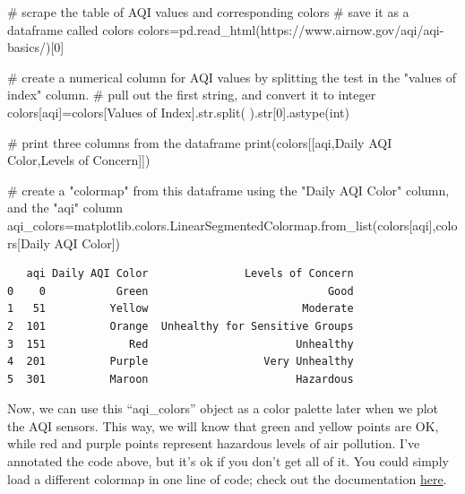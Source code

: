 \documentclass[
  letterpaper,
  DIV=11,
  numbers=noendperiod]{scrreprt}
\newenvironment{Shaded}{\begin{snugshade}}{\end{snugshade}}
\newcommand{\BuiltInTok}[1]{\textcolor[rgb]{0.00,0.23,0.31}{#1}}
\newcommand{\CommentTok}[1]{\textcolor[rgb]{0.37,0.37,0.37}{#1}}
\newcommand{\DecValTok}[1]{\textcolor[rgb]{0.68,0.00,0.00}{#1}}
\newcommand{\NormalTok}[1]{\textcolor[rgb]{0.00,0.23,0.31}{#1}}
\newcommand{\OperatorTok}[1]{\textcolor[rgb]{0.37,0.37,0.37}{#1}}
\newcommand{\StringTok}[1]{\textcolor[rgb]{0.13,0.47,0.30}{#1}}
\begin{document}
\begin{Shaded}
\begin{Highlighting}[]
\CommentTok{\# scrape the table of AQI values and corresponding colors }
\CommentTok{\# save it as a dataframe called colors}
\NormalTok{colors}\OperatorTok{=}\NormalTok{pd.read\_html(}\StringTok{\textquotesingle{}https://www.airnow.gov/aqi/aqi{-}basics/\textquotesingle{}}\NormalTok{)[}\DecValTok{0}\NormalTok{]}

\CommentTok{\# create a numerical column for AQI values by splitting the test in the "values of index" column. }
\CommentTok{\# pull out the first string, and convert it to integer}
\NormalTok{colors[}\StringTok{\textquotesingle{}aqi\textquotesingle{}}\NormalTok{]}\OperatorTok{=}\NormalTok{colors[}\StringTok{\textquotesingle{}Values of Index\textquotesingle{}}\NormalTok{].}\BuiltInTok{str}\NormalTok{.split(}\StringTok{\textquotesingle{} \textquotesingle{}}\NormalTok{).}\BuiltInTok{str}\NormalTok{[}\DecValTok{0}\NormalTok{].astype(}\BuiltInTok{int}\NormalTok{)}

\CommentTok{\# print three columns from the dataframe }
\BuiltInTok{print}\NormalTok{(colors[[}\StringTok{\textquotesingle{}aqi\textquotesingle{}}\NormalTok{,}\StringTok{\textquotesingle{}Daily AQI Color\textquotesingle{}}\NormalTok{,}\StringTok{\textquotesingle{}Levels of Concern\textquotesingle{}}\NormalTok{]])}

\CommentTok{\# create a "colormap" from this dataframe using the "Daily AQI Color" column, and the "aqi" column }
\NormalTok{aqi\_colors}\OperatorTok{=}\NormalTok{matplotlib.colors.LinearSegmentedColormap.from\_list(colors[}\StringTok{\textquotesingle{}aqi\textquotesingle{}}\NormalTok{],colors[}\StringTok{\textquotesingle{}Daily AQI Color\textquotesingle{}}\NormalTok{])}
\end{Highlighting}
\end{Shaded}

\begin{verbatim}
   aqi Daily AQI Color               Levels of Concern
0    0           Green                            Good
1   51          Yellow                        Moderate
2  101          Orange  Unhealthy for Sensitive Groups
3  151             Red                       Unhealthy
4  201          Purple                  Very Unhealthy
5  301          Maroon                       Hazardous
\end{verbatim}

Now, we can use this ``aqi\_colors'' object as a color palette later
when we plot the AQI sensors. This way, we will know that green and
yellow points are OK, while red and purple points represent hazardous
levels of air pollution. I've annotated the code above, but it's ok if
you don't get all of it. You could simply load a different colormap in
one line of code; check out the documentation
\href{https://matplotlib.org/stable/tutorials/colors/colormaps.html}{here}.
\end{document}
